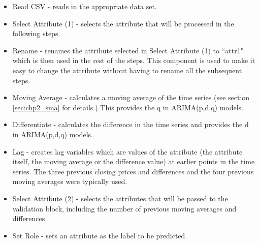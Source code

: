 \begin{itemize}
\item Read CSV - reads in the appropriate data set.
\item Select Attribute (1) - selects the attribute that will be processed in the following steps.
\item Rename - renames the attribute selected in Select Attribute (1) to \textquotedblleft attr1" which is then used in the rest of the steps. This component is used to make it easy to change the attribute without having to rename all the subsequent steps.
\item Moving Average - calculates a moving average of the time series (see section \ref{sec:chp2_sma} for details.) This provides the q in ARIMA(p,d,q) models.
\item Differentiate - calculates the difference in the time series and provides the d in ARIMA(p,d,q) models.
\item Lag - creates lag variables which are values of the attribute (the attribute itself, the moving average or the difference value) at earlier points in the time series. The three previous closing prices and differences and the four previous moving averages were typically used.
\item Select Attribute (2) - selects the attributes that will be passed to the validation block, including the number of previous moving averages and differences.
\item Set Role - sets an attribute as the label to be predicted.

\end{itemize}

